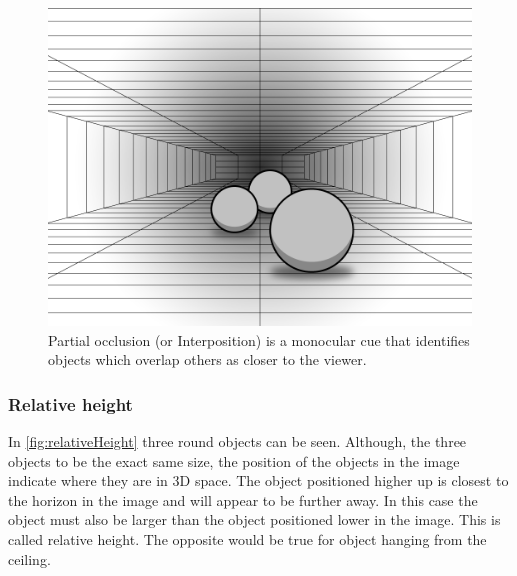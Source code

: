 \begin{figure}[H]
	\centering
	\includegraphics[width=1\linewidth]{figure/Analysis/partialOcclusion.png}
	\caption{Partial occlusion (or Interposition) is a monocular cue that identifies objects which overlap others as closer to the viewer.}
	\label{fig:partialOcclusion}
\end{figure}

\subsubsection{Relative height}
In \autoref{fig:relativeHeight} three round objects can be seen. Although, the three objects to be the exact same size, the position of the objects in the image indicate where they are in 3D space. The object positioned higher up is closest to the horizon in the image and will appear to be further away. In this case the object must also be larger than the object positioned lower in the image. This is called relative height. The opposite would be true for object hanging from the ceiling\citep{sensationPerception}.

